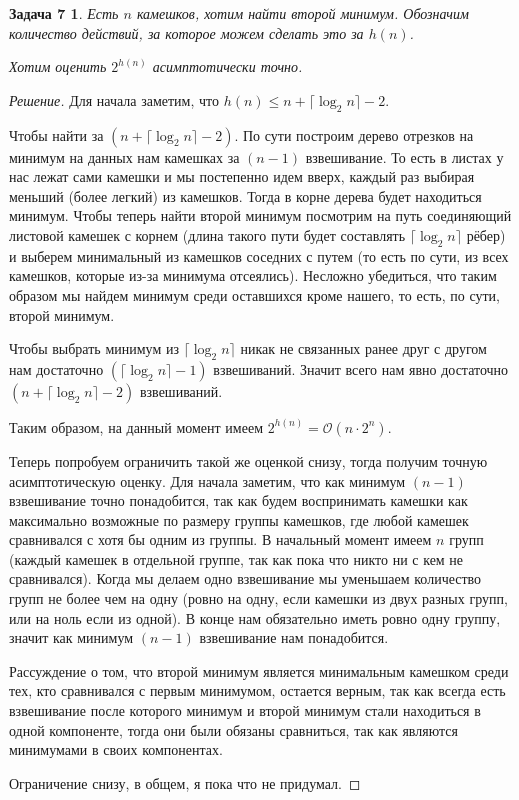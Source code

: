 \documentclass[12pt]{article}
\newenvironment{solution}{\begin{proof}[Решение]}{\end{proof}}
\newtheorem*{task_7}{Задача 7}
\begin{document}
\begin{task_7}

	Есть $n$ камешков, хотим найти второй минимум. Обозначим
	количество действий, за которое можем сделать это
	за $h(n)$.
	
	Хотим оценить $2^{h(n)}$ асимптотически точно.

\end{task_7}

\begin{solution}

	Для начала заметим, что $h(n) \leq n + \lceil\log_2{n}\rceil - 2$.

	Чтобы найти за $(n + \lceil\log_2{n}\rceil - 2)$. По сути построим дерево
	отрезков на минимум на данных нам камешках за $(n - 1)$ взвешивание.
	То есть в листах у нас лежат сами камешки и мы 
	постепенно идем вверх, каждый раз выбирая меньший 
	(более легкий) из камешков. Тогда в корне дерева
	будет находиться минимум. Чтобы теперь найти второй минимум
	посмотрим на путь соединяющий листовой камешек с корнем (длина
	такого пути будет составлять $\lceil\log_2 n\rceil$ рёбер) 
	и выберем минимальный
	из камешков соседних с путем (то есть по сути, из всех
	камешков, которые из-за минимума отсеялись). Несложно убедиться, 
	что таким образом мы найдем минимум среди оставшихся кроме нашего, 
	то есть, по сути, второй минимум. 
	
	Чтобы выбрать минимум из $\lceil\log_2 n\rceil$ 
	никак не связанных ранее 
	друг с другом нам достаточно $(\lceil\log_2 n\rceil - 1)$
	 взвешиваний.
	Значит всего нам явно достаточно $(n + \lceil\log_2{n}\rceil
	 - 2)$ взвешиваний.
	
	Таким образом, на данный момент имеем $2^{h(n)} = \mathcal{O}
	(n\cdot 2^n)$.

	Теперь попробуем ограничить такой же оценкой снизу, тогда получим
	точную асимптотическую оценку. Для начала заметим, что как минимум
	$(n - 1)$ взвешивание точно понадобится, так как будем воспринимать
	камешки как максимально возможные по размеру группы камешков,
	где любой камешек сравнивался с хотя бы одним из группы. В начальный
	момент имеем $n$ групп (каждый камешек в отдельной группе, так как
	пока что никто ни с кем не сравнивался). Когда мы делаем одно 
	взвешивание мы уменьшаем количество групп не более чем на одну
	(ровно на одну, если камешки из двух разных групп, или на ноль
	если из одной). В конце нам обязательно иметь ровно одну группу,
	значит как минимум $(n - 1)$ взвешивание нам понадобится.

	Рассуждение о том, что второй минимум является минимальным 
	камешком среди тех, кто сравнивался с первым минимумом, остается 
	верным, так как всегда есть взвешивание после которого минимум и
	второй минимум стали находиться в одной компоненте, тогда они были
	обязаны сравниться, так как являются минимумами в своих 
	компонентах.

	Ограничение снизу, в общем, я пока что не придумал.

\end{solution}
\end{document}
